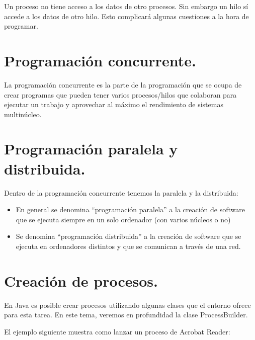 \documentclass[a4paper,12pt,spanish]{sphinxmanual}
\begin{document}
Un proceso no tiene acceso a los datos de otro procesos. Sin embargo un hilo sí accede a los datos de otro hilo. Esto complicará algunas cuestiones a la hora de programar.


\chapter{Programación concurrente.}
\label{textos/tema1:programacion-concurrente}
La programación concurrente es la parte de la programación que se ocupa de crear programas que pueden tener varios procesos/hilos que colaboran para ejecutar un trabajo y aprovechar al máximo el rendimiento de sistemas multinúcleo.


\chapter{Programación paralela y distribuida.}
\label{textos/tema1:programacion-paralela-y-distribuida}
Dentro de la programación concurrente tenemos la paralela y la distribuida:
\begin{itemize}
\item {} 
En general se denomina ``programación paralela'' a la creación de software que se ejecuta siempre en un solo ordenador (con varios núcleos o no)

\item {} 
Se denomina ``programación distribuida'' a la creación de software que se ejecuta en ordenadores distintos y que se comunican a través de una red.

\end{itemize}


\chapter{Creación de procesos.}
\label{textos/tema1:creacion-de-procesos}
En Java es posible crear procesos utilizando algunas clases que el entorno ofrece para esta tarea. En este tema, veremos en profundidad la clase ProcessBuilder.

El ejemplo siguiente muestra como lanzar un proceso de Acrobat Reader:
\end{document}
